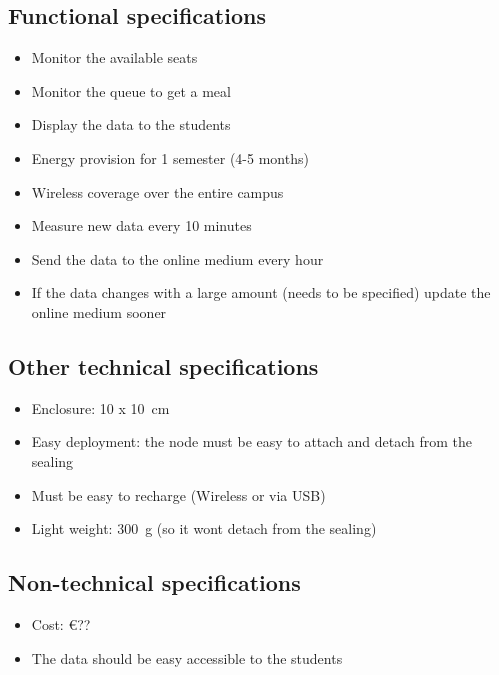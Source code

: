 \documentclass[11pt,a4paper]{article}
\begin{document}
\subsection{Functional specifications}
\begin{itemize}
	\item Monitor the available seats
	\item Monitor the queue to get a meal
	\item Display the data to the students
	\item Energy provision for 1 semester (4-5 months)
	\item Wireless coverage over the entire campus
	\item Measure new data every 10 minutes
	\item Send the data to the online medium every hour 
	\item If the data changes with a large amount (needs to be specified) update the online medium sooner
\end{itemize}

\subsection{Other technical specifications}
\begin{itemize}
	\item Enclosure: 10 x \SI{10}{\centi\meter}
	\item Easy deployment: the node must be easy to attach and detach from the sealing
	\item Must be easy to recharge (Wireless or via USB)
	\item Light weight: \SI{300}{\gram} (so it wont detach from the sealing)
\end{itemize}

\subsection{Non-technical specifications}
\begin{itemize}
	\item Cost: \euro{??}
	\item The data should be easy accessible to the students
\end{itemize}
\end{document}
